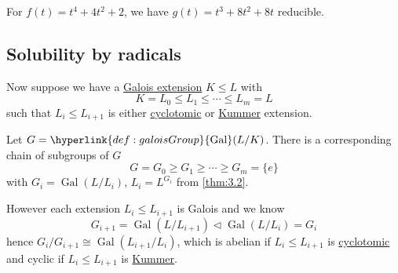 \documentclass{article}
\DeclareMathOperator{\Gal}{Gal}
\begin{document}
\begin{eg}
    For $f(t) = t^4 + 4t^2 + 2$, we have $g(t) = t^3 + 8t^2 + 8t$ reducible.
\end{eg}

\subsection{Solubility by radicals}
Now suppose we have a \hyperlink{def:galoisExt}{Galois extension} $K \leq L$ with
\begin{equation*}
    K = L_0 \leq L_1 \leq \dotsb \leq L_m = L
\end{equation*}
such that $L_i \leq L_{i+1}$ is either \hyperlink{def:cycloExt}{cyclotomic} or \hyperlink{def:kummerExt}{Kummer} extension.

Let $G = \hyperlink{def:galoisGroup}{\Gal}(L/K)$. There is a corresponding chain of subgroups of $G$
\begin{equation*}
    G = G_0 \geq G_1 \geq \dotsb \geq G_m = \{e\}
\end{equation*}
with $G_i = \Gal(L/L_i)$, $L_i = L^{G_i}$ from \cref{thm:3.2}.

However each extension $L_i \leq L_{i+1}$ is Galois and we know
\begin{equation*}
    G_{i+1} = \Gal(L/L_{i+1}) \lhd \Gal(L/L_i) = G_i
\end{equation*}
hence $G_i / G_{i+1} \cong \Gal(L_{i+1}/L_i)$, which is abelian if $L_i \leq L_{i+1}$ is \hyperlink{def:cycloExt}{cyclotomic} and cyclic if $L_i \leq L_{i+1}$ is \hyperlink{def:kummerExt}{Kummer}.

\end{document}
